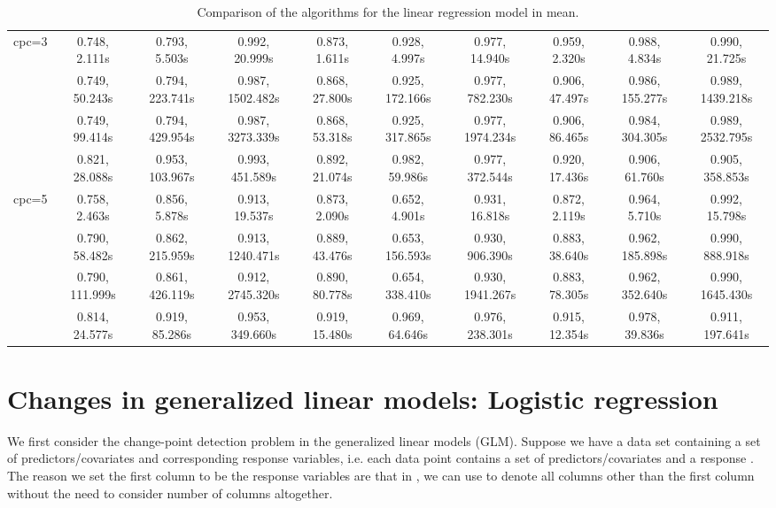 \documentclass[article]{jss}
\begin{document}
\begin{landscape}
\begin{table}[t!]
\begin{tabular}{@{}cccccccccc@{}}
  \multirow{4}{*}{cpc=3} & 0.748, 2.111s & 0.793, 5.503s & 0.992, 20.999s & 0.873, 1.611s & 0.928, 4.997s & 0.977, 14.940s & 0.959, 2.320s & 0.988, 4.834s & 0.990, 21.725s \\
                          & 0.749, 50.243s & 0.794, 223.741s & 0.987, 1502.482s & 0.868, 27.800s & 0.925, 172.166s & 0.977, 782.230s & 0.906, 47.497s & 0.986, 155.277s & 0.989, 1439.218s \\
                          & 0.749, 99.414s & 0.794, 429.954s & 0.987, 3273.339s & 0.868, 53.318s & 0.925, 317.865s & 0.977, 1974.234s & 0.906, 86.465s & 0.984, 304.305s & 0.989, 2532.795s \\
                          & 0.821, 28.088s & 0.953, 103.967s & 0.993, 451.589s & 0.892, 21.074s & 0.982, 59.986s & 0.977, 372.544s & 0.920, 17.436s & 0.906, 61.760s & 0.905, 358.853s \\ \midrule
  \multirow{4}{*}{cpc=5} & 0.758, 2.463s & 0.856, 5.878s & 0.913, 19.537s & 0.873, 2.090s & 0.652, 4.901s & 0.931, 16.818s & 0.872, 2.119s & 0.964, 5.710s & 0.992, 15.798s \\
                          & 0.790, 58.482s & 0.862, 215.959s & 0.913, 1240.471s & 0.889, 43.476s & 0.653, 156.593s & 0.930, 906.390s & 0.883, 38.640s & 0.962, 185.898s & 0.990, 888.918s \\
                          & 0.790, 111.999s & 0.861, 426.119s & 0.912, 2745.320s & 0.890, 80.778s & 0.654, 338.410s & 0.930, 1941.267s & 0.883, 78.305s & 0.962, 352.640s & 0.990, 1645.430s \\
                          & 0.814, 24.577s & 0.919, 85.286s & 0.953, 349.660s & 0.919, 15.480s & 0.969, 64.646s & 0.976, 238.301s & 0.915, 12.354s & 0.978, 39.836s & 0.911, 197.641s \\ \bottomrule
  \end{tabular}
  \caption{\label{tab:linear regression comparison} Comparison of the algorithms for the linear regression model in mean.}
\end{table}

\end{landscape}
\restoregeometry

\section{Changes in generalized linear models: Logistic regression} \label{sec:logistic_regression}

We first consider the change-point detection problem in the generalized linear
models (GLM). Suppose we have a data set containing a set of
predictors/covariates and corresponding response variables, i.e. each data point
 contains a set of predictors/covariates  and
a response . The reason we set the first column to be the
response variables are that in , we can use  to denote all
columns other than the first column without the need to consider number of
columns altogether.
\end{document}
